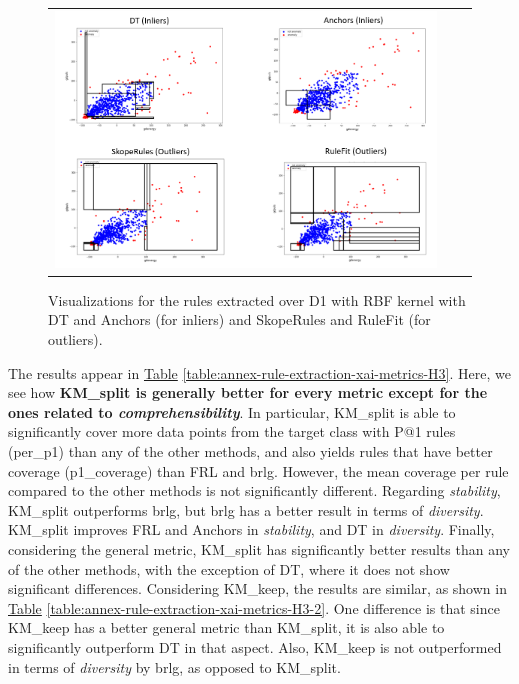 \begin{figure}[h!]
\centering
  \begin{tabular}{c@{\qquad}c@{\qquad}c}
\includegraphics[width=0.9 \columnwidth]{figures/chapter4_RuleExtraction/RuleExtractionOther.PNG}
  \end{tabular} 
  \caption{Visualizations for the rules extracted over D1 with RBF kernel with DT and Anchors (for inliers) and SkopeRules and RuleFit (for outliers). \label{fig:ch4-evaluation-img-other-2D}}
\end{figure}


The results appear in \hyperref[table:annex-rule-extraction-xai-metrics-H3]{Table} \ref{table:annex-rule-extraction-xai-metrics-H3}. Here, we see how \textbf{KM\_split is generally better for every metric except for the ones related to \textit{comprehensibility}}. In particular, KM\_split is able to significantly cover more data points from the target class with P@1 rules (per\_p1) than any of the other methods, and also yields rules that have better coverage (p1\_coverage) than FRL and brlg. However, the mean coverage per rule compared to the other methods is not significantly different. Regarding \textit{stability}, KM\_split outperforms brlg, but brlg has a better result in terms of \textit{diversity}. KM\_split improves FRL and Anchors in \textit{stability}, and DT in \textit{diversity}. Finally, considering the general metric, KM\_split has significantly better results than any of the other methods, with the exception of DT, where it does not show significant differences. Considering KM\_keep, the results are similar, as shown in \hyperref[table:annex-rule-extraction-xai-metrics-H3-2]{Table} \ref{table:annex-rule-extraction-xai-metrics-H3-2}. One difference is that since KM\_keep has a better general metric than KM\_split, it is also able to significantly outperform DT in that aspect. Also, KM\_keep is not outperformed in terms of \textit{diversity} by brlg, as opposed to KM\_split.

